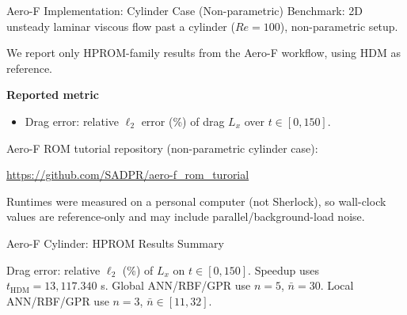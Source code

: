 \documentclass{beamer}
\begin{document}
\begin{frame}{Aero-F Implementation: Cylinder Case (Non-parametric)}
\small
Benchmark: 2D unsteady laminar viscous flow past a cylinder ($Re=100$), non-parametric setup.

\vspace{0.2em}
We report only HPROM-family results from the Aero-F workflow, using HDM as reference.

\vspace{0.2em}
\textbf{Reported metric}
\begin{itemize}
\item Drag error: relative $\ell_2$ error (\%) of drag $L_x$ over $t\in[0,150]$.
\end{itemize}

\vspace{0.2em}
{\scriptsize Aero-F ROM tutorial repository (non-parametric cylinder case):}

{\scriptsize \url{https://github.com/SADPR/aero-f_rom_turorial}}

{\scriptsize Runtimes were measured on a personal computer (not Sherlock), so wall-clock values are reference-only and may include parallel/background-load noise.}
\end{frame}

\begin{frame}{Aero-F Cylinder: HPROM Results Summary}
\tiny
\centering
{}
\vspace{0.2em}

{\tiny Drag error: relative \(\ell_2\) (\%) of \(L_x\) on \(t\in[0,150]\). Speedup uses \(t_{\mathrm{HDM}}=13{,}117.340\) s.}
{\tiny Global ANN/RBF/GPR use \(n=5\), \(\bar n=30\). Local ANN/RBF/GPR use \(n=3\), \(\bar n\in[11,32]\).}
\end{frame}
\end{document}
